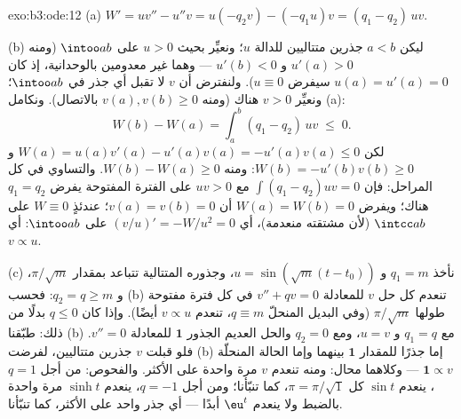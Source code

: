 \begin{solution}{exo:b3:ode:12}
(a) $W' = uv'' - u''v = u(-q_2v) - (-q_1u)v = (q_1 -
q_2)\,uv$.

(b) ليكن $a < b$ جذرين متتاليين للدالة $u$؛ ونعيِّر بحيث $u >
0$
على $\intoo ab$ (ومنه $u'(a) > 0$ و $u'(b) < 0$ --- وهما غير
معدومين بالوحدانية، إذ كان $u(a) = u'(a) = 0$ سيفرض $u
\equiv 0$). ولنفترض أن
$v$ لا تقبل أي جذر في $\intoo ab$؛ ونعيِّر $v > 0$ هناك (ومنه
$v(a), v(b) \geq 0$ بالاتصال). ونكامل (a):
\[
W(b) - W(a) = \int_a^b(q_1 - q_2)\,uv \;\leq\; 0 .
\]
لكن $W(a) = u(a)v'(a) - u'(a)v(a) = -u'(a)v(a) \leq 0$ و $W(b) = -u'(b)v(b) \geq 0$: ومنه $W(b) - W(a) \geq 0$. والتساوي في كل المراحل:
فإن $\int(q_1 - q_2)uv = 0$ مع $uv > 0$ على الفترة المفتوحة يفرض $q_1 = q_2$
هناك؛ ويفرض $W(a) =
W(b) = 0$ أن $v(a) = v(b) = 0$؛ عندئذٍ $W \equiv 0$ على
$\intcc ab$ (لأن مشتقته منعدمة)، أي $(v/u)' = -W/u^2 = 0$ على $\intoo ab$:
أي $v \propto u$.

(c) نأخذ $q_1 = m$ و $u = \sin(\sqrt m(t - t_0))$، وجذوره المتتالية تتباعد بمقدار
$\pi/\sqrt m$، و $q_2 = q \geq
m$: فحسب (b) تنعدم كل حل $v$ للمعادلة
$v'' + qv = 0$ في كل فترة مفتوحة طولها $\pi/\sqrt m$ (وفي البديل
المنحلّ $q \equiv m$، تنعدم $v \propto u$ أيضًا). وإذا كان
$q \leq 0$ بدلًا من ذلك: طبّقنا (b) مع $q_1 = q$ و $u =
v$،
ومع $q_2 = 0$ والحل العديم الجذور $\mathbf 1$ للمعادلة
$v'' = 0$. فلو قبلت $v$ جذرين متتاليين، لفرضت (b) إما جذرًا
للمقدار $\mathbf 1$ بينهما وإما الحالة المنحلّة $\mathbf 1 \propto v$ ---
وكلاهما محال: ومنه تنعدم $v$ مرة واحدة على الأكثر. والفحوص: من
أجل $q = 1$، ينعدم $\sin t$ كل $\pi
= \pi/\sqrt1$، كما تنبّأنا؛ ومن أجل
$q = -1$، ينعدم $\sinh t$ مرة واحدة بالضبط ولا ينعدم $\eu^t$
أبدًا --- أي جذر واحد على الأكثر، كما تنبّأنا.
\end{solution}

